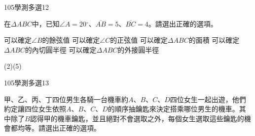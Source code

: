 \begin{QUESTIONS}
\begin{QUESTION}
        \begin{QEMPTYSPACE}
        \end{QEMPTYSPACE}
    \end{QUESTION}
    \begin{QUESTION}
        \begin{ExamInfo}{105}{學測}{多選}{12}
        \end{ExamInfo}
        \begin{ExamAnsRateInfo}{30}{46}{27}{17}
        \end{ExamAnsRateInfo}
        \begin{QBODY}
            在$\Delta ABC$中，已知$\angle A=20{}^\circ $、$\overline{AB}=5$、$\overline{BC}=4$。請選出正確的選項。
			\begin{QOPS}
				\QOP 可以確定$\angle B$的餘弦值
				\QOP 可以確定$\angle C$的正弦值
				\QOP 可以確定$\Delta ABC$的面積
				\QOP 可以確定$\Delta ABC$的內切圓半徑
				\QOP 可以確定$\Delta ABC$的外接圓半徑
			\end{QOPS}
        \end{QBODY}
        \begin{QFROMS}
        \end{QFROMS}
        \begin{QTAGS}\end{QTAGS}
        \begin{QANS}
            (2)(5)
        \end{QANS}
        \begin{QSOLLIST}
        \end{QSOLLIST}
        \begin{QEMPTYSPACE}
        \end{QEMPTYSPACE}
    \end{QUESTION}
    \begin{QUESTION}
        \begin{ExamInfo}{105}{學測}{多選}{13}
        \end{ExamInfo}
        \begin{ExamAnsRateInfo}{56}{77}{58}{33}
        \end{ExamAnsRateInfo}
        \begin{QBODY}
            甲、乙、丙、丁四位男生各騎一台機車約$A$、$B$、$C$、$D$四位女生一起出遊，他們約定讓四位女生依照$A$、$B$、$C$、$D$的順序抽鑰匙來決定搭乘哪位男生的機車。其中除了$B$認得甲的機車鑰匙，並且絕對不會選取之外，每個女生選取這些鑰匙的機會都均等。請選出正確的選項。
			\begin{QOPS}

\end{QOPS}
\end{QBODY}
\end{QUESTION}
\end{QUESTIONS}
